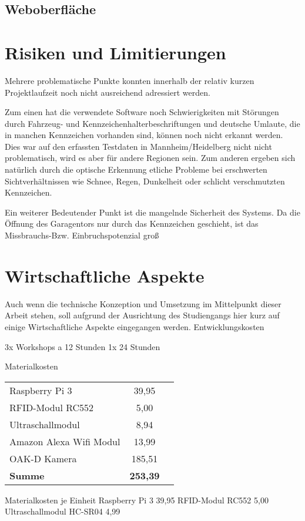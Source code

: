 \section{Weboberfläche}




\chapter{Risiken und Limitierungen}

Mehrere problematische Punkte konnten innerhalb der relativ kurzen Projektlaufzeit noch nicht ausreichend adressiert werden. 

Zum einen hat die verwendete Software noch Schwierigkeiten mit Störungen durch Fahrzeug- und Kennzeichenhalterbeschriftungen und deutsche Umlaute, die in manchen Kennzeichen vorhanden sind, können noch nicht erkannt werden. Dies war auf den erfassten Testdaten in Mannheim/Heidelberg nicht nicht problematisch, wird es aber für andere Regionen sein.
Zum anderen ergeben sich natürlich durch die optische Erkennung etliche Probleme bei erschwerten Sichtverhältnissen wie Schnee, Regen, Dunkelheit oder schlicht verschmutzten Kennzeichen. 

Ein weiterer Bedeutender Punkt ist die mangelnde Sicherheit des Systems. Da die Öffnung des Garagentors nur durch das Kennzeichen geschieht, ist das Missbrauchs-Bzw. Einbruchspotenzial groß

\chapter{Wirtschaftliche Aspekte}

Auch wenn die technische Konzeption und Umsetzung im Mittelpunkt dieser Arbeit stehen, soll aufgrund der Ausrichtung des Studiengangs hier kurz auf einige Wirtschaftliche Aspekte eingegangen werden.
Entwicklungskosten \newline

3x Workshops a 12 Stunden
1x 24 Stunden 


Materialkosten%

\begin{tabular}[h]{lcr}
Raspberry Pi 3	&   39,95 \autocite{Pi3b} \newline \\
RFID-Modul RC552 &		5,00\autocite{RFID} \newline\\
Ultraschallmodul	&  8,94\autocite{SR04} \newline \\
Amazon Alexa Wifi Modul & 13,99\autocite{eWe}	\\
OAK-D Kamera & 185,51 \\
\textbf{Summe}			&	\textbf{253,39}
\end{tabular} \newline



Materialkosten je Einheit
Raspberry Pi 3 			   39,95
RFID-Modul RC552			5,00
Ultraschallmodul HC-SR04	4,99





